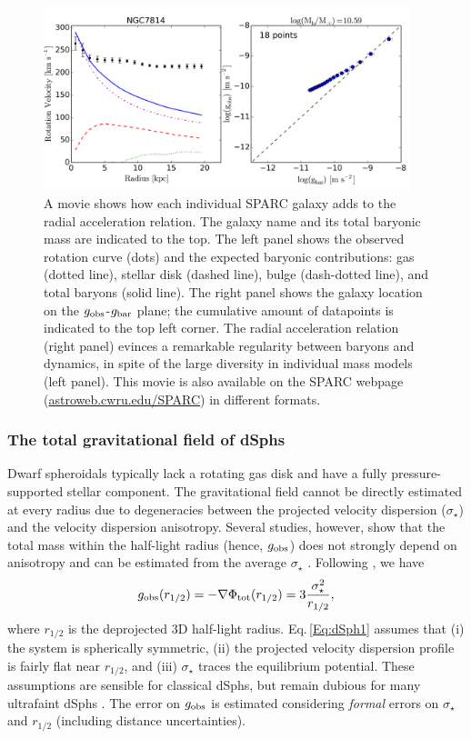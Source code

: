 \documentclass[apjl, twocolappendix]{emulateapj}
\begin{document}
\begin{figure}[thb]
\centering
\includegraphics[width=0.95\textwidth]{RAR_Video.pdf}
\caption{A movie shows how each individual SPARC galaxy adds to the radial acceleration relation. The galaxy name and its total baryonic mass are indicated to the top. The left panel shows the observed rotation curve (dots) and the expected baryonic contributions: gas (dotted line), stellar disk (dashed line), bulge (dash-dotted line), and total baryons (solid line). The right panel shows the galaxy location on the $g_{\rm obs}$-$g_{\rm bar}$ plane; the cumulative amount of datapoints is indicated to the top left corner. The radial acceleration relation (right panel) evinces a remarkable regularity between baryons and dynamics, in spite of the large diversity in individual mass models (left panel). This movie is also available on the SPARC webpage (\href{url}{astroweb.cwru.edu/SPARC}) in different formats.}
\label{fig:Video}
\end{figure}
\subsubsection{The total gravitational field of dSphs}

Dwarf spheroidals typically lack a rotating gas disk and have a fully pressure-supported stellar component. The gravitational field cannot be directly estimated at every radius due to degeneracies between the projected velocity dispersion ($\sigma_{\star}$) and the velocity dispersion anisotropy. Several studies, however, show that the total mass within the half-light radius (hence, $g_{\rm obs}$) does not strongly depend on anisotropy and can be estimated from the average $\sigma_{\star}$ \citep{2009ApJ...704.1274W, Wolf2010, Amorisco2011}. Following \citet{Wolf2010}, we have
\begin{equation}\label{Eq:dSph1}
 g_{\rm obs}(r_{1/2}) = -\nabla\Phi_{\rm tot}(r_{1/2}) = 3 \dfrac{\sigma_{\star}^{2}}{r_{1/2}},
\end{equation}
where $r_{1/2}$ is the deprojected 3D half-light radius. Eq.\,\ref{Eq:dSph1} assumes that (i) the system is spherically symmetric, (ii) the projected velocity dispersion profile is fairly flat near $r_{1/2}$, and (iii) $\sigma_{\star}$ traces the equilibrium potential. These assumptions are sensible for classical dSphs, but remain dubious for many ultrafaint dSphs \citep{McGaugh2010}. The error on $g_{\rm obs}$ is estimated considering \textit{formal} errors on $\sigma_{\star}$ and $r_{1/2}$ (including distance uncertainties). 
\end{document}
